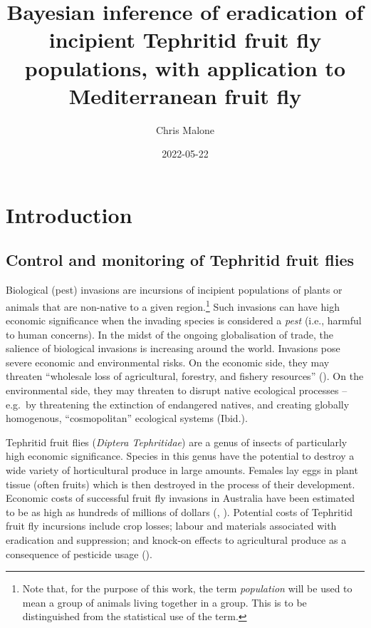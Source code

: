 \documentclass[
  oneside]{book}
\title{Bayesian inference of eradication of incipient Tephritid fruit fly populations, with application to Mediterranean fruit fly}
\author{Chris Malone}
\date{2022-05-22}
\begin{document}
\maketitle

\renewcommand{\baselinestretch}{1}\normalsize
\tableofcontents
\renewcommand{\baselinestretch}{2}\normalsize

\hypertarget{introduction}{%
\chapter{Introduction}\label{introduction}}

\hypertarget{control-and-monitoring-of-tephritid-fruit-flies}{%
\section{Control and monitoring of Tephritid fruit flies}\label{control-and-monitoring-of-tephritid-fruit-flies}}

Biological (pest) invasions are incursions of incipient populations of plants or animals that are non-native to a given region.\footnote{Note that, for the purpose of this work, the term \emph{population} will be used to mean a group of animals living together in a group. This is to be distinguished from the statistical use of the term.} Such invasions can have high economic significance when the invading species is considered a \emph{pest} (i.e., harmful to human concerns). In the midst of the ongoing globalisation of trade, the salience of biological invasions is increasing around the world. Invasions pose severe economic and environmental risks. On the economic side, they may threaten ``wholesale loss of agricultural, forestry, and fishery resources'' (\citet{mack2000}). On the environmental side, they may threaten to disrupt native ecological processes -- e.g.~by threatening the extinction of endangered natives, and creating globally homogenous, ``cosmopolitan'' ecological systems (Ibid.).

Tephritid fruit flies (\emph{Diptera Tephritidae}) are a genus of insects of particularly high economic significance. Species in this genus have the potential to destroy a wide variety of horticultural produce in large amounts. Females lay eggs in plant tissue (often fruits) which is then destroyed in the process of their development. Economic costs of successful fruit fly invasions in Australia have been estimated to be as high as hundreds of millions of dollars (\citet{suckling2016}, \citet{hancock2000}). Potential costs of Tephritid fruit fly incursions include crop losses; labour and materials associated with eradication and suppression; and knock-on effects to agricultural produce as a consequence of pesticide usage (\citet{suckling2016}).
\end{document}
